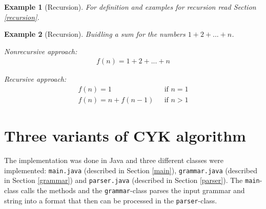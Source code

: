 \documentclass[a4paper, 11pt]{article}
\newtheorem*{example*}{Example}
\begin{document}
\begin{example*}[Recursion]

For definition and examples for recursion read Section \ref{recursion}.

\end{example*}

\newpage

\begin{example*}[Recursion]
Buidling a sum for the numbers $1+2+...+n$.

Nonrecursive approach:
\begin{align*}
f(n) = 1+2+...+n
\end{align*}

Recursive approach:
\begin{align*}
f(n) = 1 \ \ \ \ \ \ \ \ \ \ \ \ \ \ \  & \ \ \ \text{if } n=1 \\
f(n) = n + f(n-1) & \ \ \ \text{if } n > 1
\end{align*}

\end{example*}












\pagebreak













\section{Three variants of CYK algorithm}
\label{systemdesign}

The implementation was done in Java and three different classes were implemented: \texttt{main.java} (described in Section \ref{main}), \texttt{grammar.java} (described in Section \ref{grammar}) and \texttt{parser.java} (described in Section \ref{parser}). The \texttt{main}-class calls the methods and the \texttt{grammar}-class parses the input grammar and string into a format that then can be processed in the \texttt{parser}-class.


\end{document}
